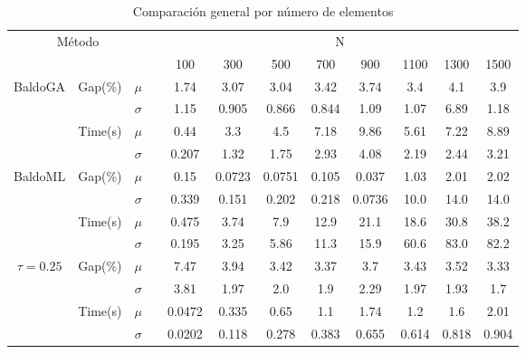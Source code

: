 \documentclass[spanish, a4paper, 12pt, openany,final]{book}
\begin{document}
\begin{table}[h]

	\begin{adjustbox}{width=\columnwidth,center}
	\begin{tabular}{cccccccccccc}
		
		\multicolumn{3}{c}{Método}&  &\multicolumn{8}{c}{N}\\
		\cline{1-3} \cline{5-12}
		\multicolumn{3}{c}{} &  & 100  & 300  & 500  & 700  & 900  & 1100 & 1300 & 1500\\
		\hline
		\multirow{4}{*}{BaldoGA} & \multirow{2}{*}{Gap(\%)} & $\mu$ && 1.74 & 3.07 & 3.04 & 3.42 & 3.74 & 3.4 & 4.1 & 3.9 \\
		&                          & $\sigma$ & & 1.15 & 0.905 & 0.866 & 0.844 & 1.09 & 1.07 & 6.89 & 1.18 \\
		\cline{2-3}
		& \multirow{2}{*}{Time(s)} & $\mu$ && 0.44 & 3.3 & 4.5 & 7.18 & 9.86 & 5.61 & 7.22 & 8.89 \\
		&                          & $\sigma$ & & 0.207 & 1.32 & 1.75 & 2.93 & 4.08 & 2.19 & 2.44 & 3.21 \\
		\hline		 						 
		\multirow{4}{*}{BaldoML} & \multirow{2}{*}{Gap(\%)} & $\mu$ && 0.15 & 0.0723 & 0.0751 & 0.105 & 0.037 & 1.03 & 2.01 & 2.02 \\
		&                          & $\sigma$ & & 0.339 & 0.151 & 0.202 & 0.218 & 0.0736 & 10.0 & 14.0 & 14.0 \\
		\cline{2-3}
		& \multirow{2}{*}{Time(s)} & $\mu$ && 0.475 & 3.74 & 7.9 & 12.9 & 21.1 & 18.6 & 30.8 & 38.2 \\
		&                          & $\sigma$ & & 0.195 & 3.25 & 5.86 & 11.3 & 15.9 & 60.6 & 83.0 & 82.2 \\
		\hline		 						 
		
		\multirow{4}{*}{$\tau=0.25$} & \multirow{2}{*}{Gap(\%)} & $\mu$ && 7.47 & 3.94 & 3.42 & 3.37 & 3.7 & 3.43 & 3.52 & 3.33 \\
		&                          & $\sigma$ & & 3.81 & 1.97 & 2.0 & 1.9 & 2.29 & 1.97 & 1.93 & 1.7 \\
		\cline{2-3}
		& \multirow{2}{*}{Time(s)} & $\mu$ && 0.0472 & 0.335 & 0.65 & 1.1 & 1.74 & 1.2 & 1.6 & 2.01 \\
		&                          & $\sigma$ & & 0.0202 & 0.118 & 0.278 & 0.383 & 0.655 & 0.614 & 0.818 & 0.904 \\
		\hline		 						 	
	
	\end{tabular}
	
	\end{adjustbox}
		\caption{Comparación general por número de elementos}
		\label{tab:comparison_table}	
\end{table}
\end{document}
